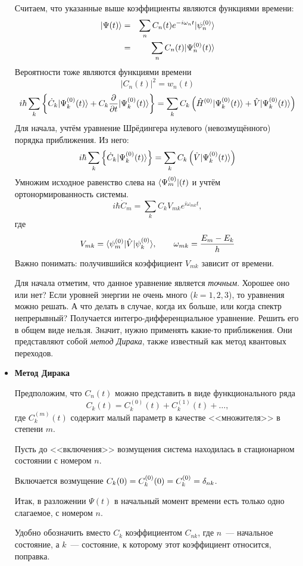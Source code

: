 \begin{itemize}
Считаем, что указанные выше коэффициенты являются функциями времени:
\begin{eqnarray*}
    | \Psi (t) \rangle &=& \sum_n C_n (t) e^{-i \omega_n t} | \psi_n^{(0)} \rangle \\
&=& \sum _n C_n (t) | \Psi_n^{(0)} (t) \rangle
\end{eqnarray*}
Вероятности тоже являются функциями времени
$$
    |C_n(t)|^2 = w_n(t)
$$
$$
    i \hbar \sum_{k} \left\{
    \dot C_k | \Psi_k^{(0)} (t) \rangle + C_k \dfrac{\partial}{\partial t} | \Psi_k^{(0)} (t) \rangle
    \right\} =
\sum_{k} C_k \left(
        \hat H^{(0)} | \Psi_k^{(0)} (t) \rangle + \hat V | \Psi_k^{(0)} (t) \rangle
    \right)
$$
Для начала, учтём уравнение Шрёдингера нулевого (невозмущённого) порядка приближения. Из него:
$$
    i \hbar \sum_{k} \left\{
    \dot C_k | \Psi_k^{(0)} (t) \rangle
    \right\} =
\sum_{k} C_k \left(
         \hat V | \Psi_k^{(0)} (t) \rangle
    \right)
$$
Умножим исходное равенство слева на $\langle \Psi_{m}^{(0)} | (t)$ и учтём ортонормированность системы.
$$
    i \hbar \dot C_m = \sum_k C_k V_{mk} e^{i \omega_{mk} t},
$$
где
$$
    V_{mk} = { \langle \psi_m^{(0)} |\hat V| \psi_k^{(0)} \rangle }, \qquad \omega_{mk} = \dfrac{E_m - E_k}{h}
$$
Важно понимать: получившийся коэффициент $V_{mk}$ зависит от времени.

Для начала отметим, что данное уравнение является \emph{точным}. Хорошее оно или нет? Если уровней энергии не очень много ($k = 1, 2, 3$), то уравнения можно решать. А что делать в случае, когда их больше, или когда спектр непрерывный? Получается интегро-дифференциальное уравнение. Решить его в общем виде нельзя. Значит, нужно применять какие-то приближения. Они представляют собой \emph{метод Дирака}, также известный как метод квантовых переходов.
\item \textbf{Метод Дирака}

Предположим, что $C_n(t)$ можно представить в виде функционального ряда
$$
    C_k(t) = C_k^{(0)} (t) + C_k^{(1)} (t) + \ldots,
$$
где $C_k^{(m)} (t)$ содержит малый параметр в качестве <<множителя>> в степени $m$.

Пусть до <<включения>> возмущения система находилась в стационарном состоянии с номером $n$.

Включается возмущение $C_k(0) = C_k^{(0)} (0) = C_k^{(0)} = \delta_{nk}$.

Итак, в разложении $\Psi(t)$ в начальный момент времени есть только одно слагаемое, с номером $n$.

Удобно обозначить вместо $C_k$ коэффициентом $C_{nk}$, где $n$~--- начальное состояние, а $k$~--- состояние, к которому этот коэффициент относится, поправка.


\end{itemize}
